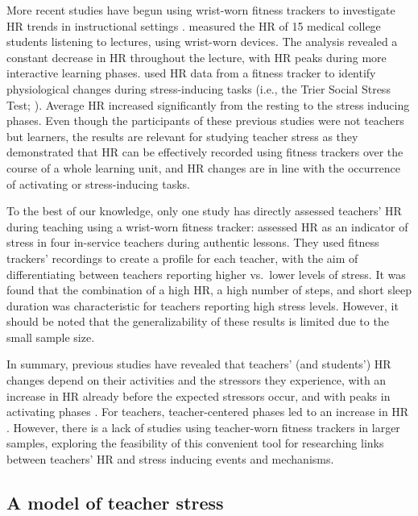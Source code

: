 \documentclass[preprint, 3p,
sort,]{elsarticle} %
\begin{document}
More recent studies have begun using wrist-worn fitness trackers to
investigate HR trends in instructional settings
\citep{Darnell2019, chalmers2021}. \citet{Darnell2019} measured the HR
of 15 medical college students listening to lectures, using wrist-worn
devices. The analysis revealed a constant decrease in HR throughout the
lecture, with HR peaks during more interactive learning phases.
\citet{chalmers2021} used HR data from a fitness tracker to identify
physiological changes during stress-inducing tasks (i.e., the Trier
Social Stress Test; \citet{kirschbaum1993trier}). Average HR increased
significantly from the resting to the stress inducing phases. Even
though the participants of these previous studies
\citep{Darnell2019, chalmers2021} were not teachers but learners, the
results are relevant for studying teacher stress as they demonstrated
that HR can be effectively recorded using fitness trackers over the
course of a whole learning unit, and HR changes are in line with the
occurrence of activating or stress-inducing tasks.

To the best of our knowledge, only one study has directly assessed
teachers' HR during teaching using a wrist-worn fitness tracker:
\citet{runge2020} assessed HR as an indicator of stress in four
in-service teachers during authentic lessons. They used fitness
trackers' recordings to create a profile for each teacher, with the aim
of differentiating between teachers reporting higher vs.~lower levels of
stress. It was found that the combination of a high HR, a high number of
steps, and short sleep duration was characteristic for teachers
reporting high stress levels. However, it should be noted that the
generalizability of these results is limited due to the small sample
size.

In summary, previous studies have revealed that teachers' (and
students') HR changes depend on their activities and the stressors they
experience, with an increase in HR already before the expected stressors
occur, and with peaks in activating phases
\citep{Darnell2019, chalmers2021}. For teachers, teacher-centered phases
led to an increase in HR
\citep{sperka1995, scheuch1997psychophysische, donker2018, junker2021}.
However, there is a lack of studies using teacher-worn fitness trackers
in larger samples, exploring the feasibility of this convenient tool for
researching links between teachers' HR and stress inducing events and
mechanisms.

\subsection{A model of teacher stress}\label{a-model-of-teacher-stress}
\end{document}
